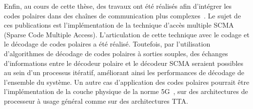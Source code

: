 Enfin, au cours de cette thèse, des travaux ont été réalisés afin d'intégrer les codes polaires dans des chaînes de communication plus complexes~. Le sujet de ces publications est l'implémentation de la technique d'accès multiple SCMA (Sparse Code Multiple Access). L'articulation de cette technique avec le codage et le décodage de codes polaires a été réalisé. Toutefois, par l'utilisation d'algorithmes de décodage de codes polaires à sorties souples, des échanges d'informations entre le décodeur polaire et le décodeur SCMA seraient possibles au sein d'un processus itératif, améliorant ainsi les performances de décodage de l'ensemble du système. Un autre cas d'application des codes polaires pourrait être l'implémentation de la couche physique de la norme 5G~\cite{3gpp_ts_2017}, sur des architectures de processeur à usage général comme sur des architectures TTA.
